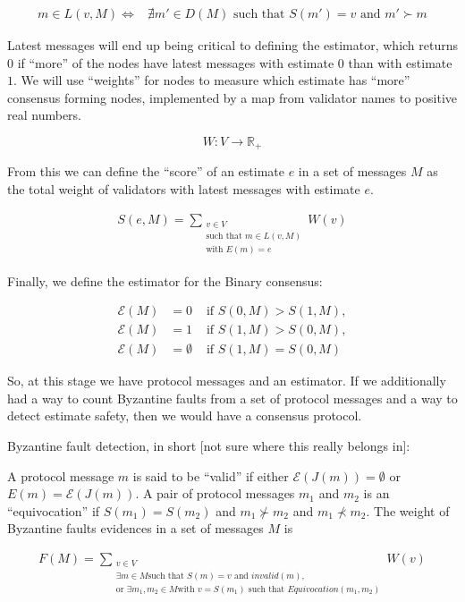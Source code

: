 \documentclass{article}
\theoremstyle{definition}
\begin{document}
\begin{equation}
\begin{split}
m \in L(v, M) \iff & \nexists m' \in D(M) \text{ such that } S(m') = v \text{ and } m' \succ m
\end{split}
\end{equation}

Latest messages will end up being critical to defining the estimator, which returns $0$ if ``more'' of the nodes have latest messages with estimate $0$ than with estimate $1$. We will use ``weights'' for nodes to measure which estimate has ``more'' consensus forming nodes, implemented by a map from validator names to positive real numbers.

$$
W:V \to \mathbb{R}_+
$$

From this we can define the ``score'' of an estimate $e$ in a set of messages $M$ as the total weight of validators with latest messages with estimate $e$.

\begin{align}
S(e, M) = \sum_{\substack{v \in V \\ \text{such that } m \in L(v,M) \\ \text{with } E(m) = e}} W(v)
\end{align}

Finally, we define the estimator for the Binary consensus:
	
\begin{align}
	\mathcal{E}(M) &= 0 &\text{ if } S(0, M) > S(1, M), \\
	\mathcal{E}(M) &= 1 &\text{ if } S(1, M) > S(0, M), \\
	\mathcal{E}(M) &= \emptyset &\text{ if } S(1, M) = S(0, M)
\end{align}

So, at this stage we have protocol messages and an estimator. If we additionally had a way to count Byzantine faults from a set of protocol messages and a way to detect estimate safety, then we would have a consensus protocol.

Byzantine fault detection, in short [not sure where this really belongs in]:

A protocol message $m$ is said to be ``valid'' if either $\mathcal{E}(J(m)) = \emptyset$ or $E(m) = \mathcal{E}(J(m))$.
A pair of protocol messages $m_1$ and $m_2$ is an ``equivocation'' if $S(m_1) = S(m_2)$ and $m_1 \nsucc m_2$ and $m_1 \nprec m_2$.
The weight of Byzantine faults evidences in a set of messages $M$ is

\begin{align}
F(M) = \sum_{\substack{v \in V \\ \exists m \in M \text{such that } S(m) = v \text{ and } invalid(m), \\ \text{or } \exists m_1, m_2 \in M \text{with $v = S(m_1)$ such that } Equivocation(m_1, m_2)}} W(v)
\end{align}
\end{document}
